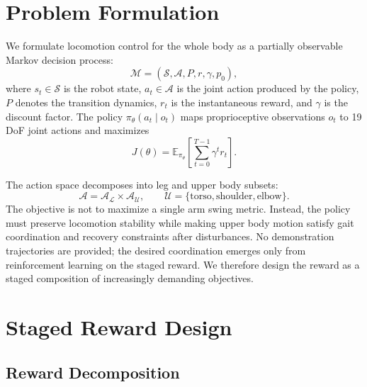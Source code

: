 \documentclass{article}
\begin{document}
\section{Problem Formulation}

We formulate locomotion control for the whole body as a partially observable Markov decision process:
\begin{equation}
\mathcal{M}=(\mathcal{S},\mathcal{A},P,r,\gamma,p_0),
\end{equation}
where $s_t\in\mathcal{S}$ is the robot state, $a_t\in\mathcal{A}$ is the joint action produced by the policy, $P$ denotes the transition dynamics, $r_t$ is the instantaneous reward, and $\gamma$ is the discount factor. The policy $\pi_\theta(a_t\mid o_t)$ maps proprioceptive observations $o_t$ to 19 DoF joint actions and maximizes
\begin{equation}
J(\theta)=
\mathbb{E}_{\pi_\theta}
\left[
\sum_{t=0}^{T-1}\gamma^t r_t
\right].
\end{equation}

The action space decomposes into leg and upper body subsets:
\begin{equation}
\mathcal{A}=\mathcal{A}_{\mathcal{L}}\times\mathcal{A}_{\mathcal{U}},
\qquad
\mathcal{U}=\{\text{torso},\text{shoulder},\text{elbow}\}.
\end{equation}
The objective is not to maximize a single arm swing metric. Instead, the policy must preserve locomotion stability while making upper body motion satisfy gait coordination and recovery constraints after disturbances. No demonstration trajectories are provided; the desired coordination emerges only from reinforcement learning on the staged reward. We therefore design the reward as a staged composition of increasingly demanding objectives.

\section{Staged Reward Design}

\subsection{Reward Decomposition}
\end{document}
